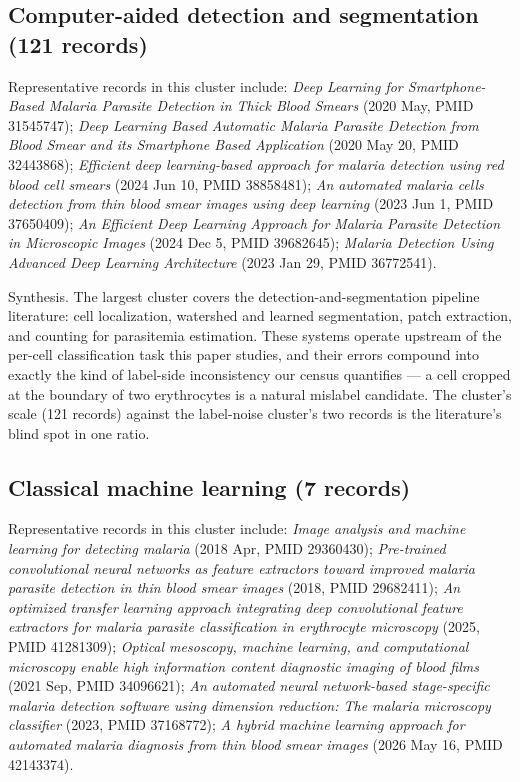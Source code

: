 \subsection*{Computer-aided detection and segmentation (121 records)}
Representative records in this cluster include: \emph{Deep Learning for Smartphone-Based Malaria Parasite Detection in Thick Blood Smears} (2020 May, PMID 31545747); \emph{Deep Learning Based Automatic Malaria Parasite Detection from Blood Smear and its Smartphone Based Application} (2020 May 20, PMID 32443868); \emph{Efficient deep learning-based approach for malaria detection using red blood cell smears} (2024 Jun 10, PMID 38858481); \emph{An automated malaria cells detection from thin blood smear images using deep learning} (2023 Jun 1, PMID 37650409); \emph{An Efficient Deep Learning Approach for Malaria Parasite Detection in Microscopic Images} (2024 Dec 5, PMID 39682645); \emph{Malaria Detection Using Advanced Deep Learning Architecture} (2023 Jan 29, PMID 36772541).\par

Synthesis. The largest cluster covers the detection-and-segmentation pipeline literature: cell localization, watershed and learned segmentation, patch extraction, and counting for parasitemia estimation. These systems operate upstream of the per-cell classification task this paper studies, and their errors compound into exactly the kind of label-side inconsistency our census quantifies --- a cell cropped at the boundary of two erythrocytes is a natural mislabel candidate. The cluster's scale (121 records) against the label-noise cluster's two records is the literature's blind spot in one ratio.


\subsection*{Classical machine learning (7 records)}
Representative records in this cluster include: \emph{Image analysis and machine learning for detecting malaria} (2018 Apr, PMID 29360430); \emph{Pre-trained convolutional neural networks as feature extractors toward improved malaria parasite detection in thin blood smear images} (2018, PMID 29682411); \emph{An optimized transfer learning approach integrating deep convolutional feature extractors for malaria parasite classification in erythrocyte microscopy} (2025, PMID 41281309); \emph{Optical mesoscopy, machine learning, and computational microscopy enable high information content diagnostic imaging of blood films} (2021 Sep, PMID 34096621); \emph{An automated neural network-based stage-specific malaria detection software using dimension reduction: The malaria microscopy classifier} (2023, PMID 37168772); \emph{A hybrid machine learning approach for automated malaria diagnosis from thin blood smear images} (2026 May 16, PMID 42143374).\par

